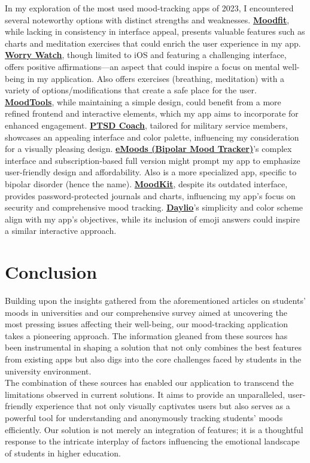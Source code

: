 \documentclass[11pt]{report}
\begin{document}
In my exploration of the most used mood-tracking apps of 2023, I encountered several noteworthy options with distinct strengths and weaknesses. \textbf{\href{https://www.getmoodfit.com/}{Moodfit}}, while lacking in consistency in interface appeal, presents valuable features such as charts and meditation exercises that could enrich the user experience in my app. \textbf{\href{https://worrywatch.com/}{Worry Watch}}, though limited to iOS and featuring a challenging interface, offers positive affirmations—an aspect that could inspire a focus on mental well-being in my application. Also offers exercises (breathing, meditation) with a variety of options/modifications that create a safe place for the user. \textbf{\href{https://www.moodtools.org/}{MoodTools}}, while maintaining a simple design, could benefit from a more refined frontend and interactive elements, which my app aims to incorporate for enhanced engagement. \textbf{\href{https://mobile.va.gov/app/ptsd-coach}{PTSD Coach}}, tailored for military service members, showcases an appealing interface and color palette, influencing my consideration for a visually pleasing design. \textbf{\href{https://emoodtracker.com/}{eMoods (Bipolar Mood Tracker)}}'s complex interface and subscription-based full version might prompt my app to emphasize user-friendly design and affordability. Also is a more specialized app, specific to bipolar disorder (hence the name). \textbf{\href{https://www.thriveport.com/products/moodkit/}{MoodKit}}, despite its outdated interface, provides password-protected journals and charts, influencing my app's focus on security and comprehensive mood tracking. \textbf{\href{https://daylio.net/}{Daylio}}'s simplicity and color scheme align with my app's objectives, while its inclusion of emoji answers could inspire a similar interactive approach.

\section{Conclusion}

Building upon the insights gathered from the aforementioned articles on students' moods in universities and our comprehensive survey aimed at uncovering the most pressing issues affecting their well-being, our mood-tracking application takes a pioneering approach. The information gleaned from these sources has been instrumental in shaping a solution that not only combines the best features from existing apps but also digs into the core challenges faced by students in the university environment.\vspace{5mm} \\
The combination of these sources has enabled our application to transcend the limitations observed in current solutions. It aims to provide an unparalleled, user-friendly experience that not only visually captivates users but also serves as a powerful tool for understanding and anonymously tracking students' moods efficiently. Our solution is not merely an integration of features; it is a thoughtful response to the intricate interplay of factors influencing the emotional landscape of students in higher education.
\end{document}
